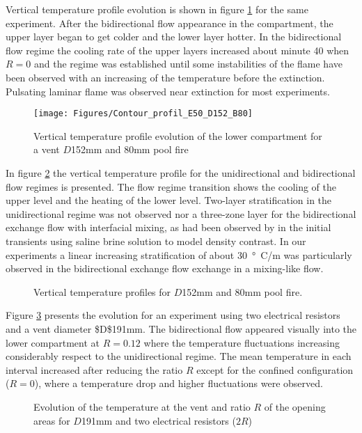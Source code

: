 \documentclass[preprint,12pt]{elsarticle}
\begin{document}
Vertical temperature profile evolution is shown in figure \ref{fig:contour} for the same experiment. After the bidirectional flow appearance in the compartment, the upper layer began to get colder and the lower layer hotter. In the bidirectional flow regime the cooling rate of the upper layers increased about minute 40 when \(R=0\) and the regime was established until some instabilities of the flame have been observed with an increasing of the temperature before the extinction. Pulsating laminar flame was observed near extinction for most experiments.

\begin{figure}[h!]
\centering
\texttt{[image: Figures/Contour\_profil\_E50\_D152\_B80]}
\caption{Vertical temperature profile evolution of the lower compartment for a vent $D$152mm and 80mm pool fire}
\label{fig:contour}
\end{figure}

In figure \ref{fig:profil} the vertical temperature profile for the
unidirectional and bidirectional flow regimes is presented. The flow
regime transition shows the cooling of the upper level and the heating
of the lower level. Two-layer stratification in the unidirectional
regime was not observed nor a three-zone layer for the bidirectional
exchange flow with interfacial mixing, as had been observed by
\cite{hunt_coffey_2010} in the initial transients using saline brine
solution to model density contrast. In our experiments a linear
increasing stratification of about \SI{30}{\degree C/m} was particularly observed in the bidirectional exchange flow exchange in a mixing-like flow.

\begin{figure}[h!]
\centering
\resizebox{0.54\textwidth}{!}{}
\caption{Vertical temperature profiles for $D$152mm and 80mm pool fire.}
\label{fig:profil}
\end{figure}

Figure \ref{fig:evol_mono-bidi_R} presents the evolution for an experiment using two electrical resistors and a vent diameter \$D\$191mm. The bidirectional flow appeared visually into the lower compartment at \(R=0.12\) where the temperature fluctuations increasing considerably respect to the unidirectional regime. The mean temperature in each interval increased after reducing the ratio \(R\) except for the confined configuration (\(R=0\)), where a temperature drop and higher fluctuations were observed.

\begin{figure}[h!]
\centering
\resizebox{0.54\textwidth}{!}{}
\caption{Evolution of the temperature at the vent and ratio $R$ of the opening areas for $D$191mm and two electrical resistors ($2R$)}
\label{fig:evol_mono-bidi_R}
\end{figure}
\end{document}
